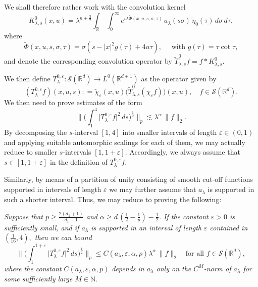 \documentclass[leqno]{amsart}
\theoremstyle{definition}
\theoremstyle{remark}
\numberwithin{equation}{section}
\newcommand{\R}{\mathbb{R}}
\newcommand{\N}{\mathbb{N}}
\newcommand{\eps}{\varepsilon}
\newcommand\la{{\lambda}}
\newcommand\ve{{\varepsilon}}
\begin{document}
\smallskip

We shall therefore rather work with the convolution kernel 
\begin{equation}\label{eq:Klats-formula}
K_{\lambda,s}^{0}(x, u) = \lambda^{n+\frac32}  \int_\R \, \int_0^\infty e^{i\lambda\tilde \Phi(x,u,s,\sigma,\tau)} \, a_\lambda(s\sigma) \, \tilde \eta_0( \tau)  \, d\sigma \, d\tau,
\end{equation}
where 
\begin{equation} \label{eq:phasesdef}
\tilde \Phi(x,u,s,\sigma,\tau) =\sigma(s-|x|^2 g(\tau) +4u\tau), \quad\text{ with } g(\tau)=\tau\cot \tau,
\end{equation}
and denote the corresponding convolution operator by $\tilde T^0_{\la,s} f=f*K_{\lambda,s}^{0}.$

We then define $T^{0,\varepsilon}_\lambda :\mathcal S(\R^d) \to L^0(\R^{d + 1})$ as  the operator given by
\begin{equation}\label{eq:xut}
(T^{0,\varepsilon}_\lambda f)(x,u,s) : = \tilde\chi_\varepsilon(x,u) \big(\tilde T_{\lambda,s}^0(\chi_\varepsilon f)\big)(x,u),\quad f\in \mathcal S(\R^d).
\end{equation} 
We then need to prove estimates of the form 
\[
\Big\| \Big( \int_1^4 \big| T^{0,\varepsilon}_\lambda f \big|^2 \, ds \Big)^{\frac{1}{2}} \Big\|_p
\lesssim \lambda^\alpha \, \|f\|_2.
\]
By decomposing the $s$-interval $[1,4]$ into smaller intervals of length $\ve\in(0,1)$ and applying suitable automorphic 
scalings for each of them, we may actually  reduce to smaller $s$-intervals $[1,1+\ve].$  Accordingly, we always assume that  $s\in[1,1+\ve]$ in the definition of  $T^{0,\varepsilon}_\lambda f.$

Similarly, by means of a partition of unity  consisting of smooth cut-off functions supported in intervals of length $\ve$ we may further assume that $a_\la$ is supported in such a shorter interval. Thus, we may reduce to proving the following:

\medskip
{\it 
Suppose that  $p\ge \frac{2(d_1+1)}{d_1-1}$ and $\alpha \ge  d \, (\tfrac12-\tfrac1p)-\tfrac12$.
If the constant $\ve>0$ is  sufficiently small, and if $a_\la$ is supported in an interval of length $\ve$ contained in 
$(\frac 1{16},4),$ then we can bound 
\begin{equation}\label{eq:T0lambdas}
\Big\| \Big( \int_1^{1+\ve} \big| T^{0,\varepsilon}_\lambda f \big|^2 \, ds \Big)^{\frac{1}{2}} \Big\|_p
\le C(a_\lambda,\eps, \alpha,p)\lambda^\alpha \, \|f\|_2 \quad \text{for all } f\in \mathcal S(\R^d),
\end{equation}
where the constant  $C(a_\lambda,\eps, \alpha,p)$ depends in $a_\la$ only on the $C^M$-norm of $a_\lambda$ for some sufficiently large $M\in\N.$}
\smallskip
\end{document}
